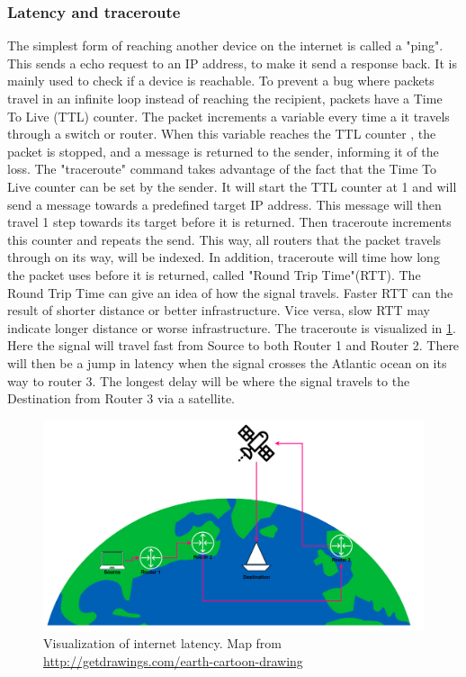 \subsubsection{Latency and traceroute} \label{sec:latency_method}
The simplest form of reaching another device on the internet is called a "ping". This sends a echo request to an IP address, to make it send a response back. It is mainly used to check if a device is reachable. To prevent a bug where packets travel in an infinite loop instead of reaching the recipient, packets have a Time To Live (TTL) counter. The packet increments a variable every time a it travels through a switch or router. When this variable reaches the TTL counter , the packet is stopped, and a message is returned to the sender, informing it of the loss.
The "traceroute" command takes advantage of the fact that the Time To Live counter can be set by the sender. It will start the TTL counter at 1 and will send a message towards a predefined target IP address. This message will then travel 1 step towards its target before it is returned. Then traceroute increments this counter and repeats the send. This way, all routers that the packet travels through on its way, will be indexed. In addition, traceroute will time how long the packet uses before it is returned, called "Round Trip Time"(RTT).
The Round Trip Time can give an idea of how the signal travels. Faster RTT can the result of shorter distance or better infrastructure. Vice versa, slow RTT may indicate longer distance or worse infrastructure.
The traceroute is visualized in \cref{fig:latency}. Here the signal will travel fast from Source to both Router 1 and Router 2. There will then be a jump in latency when the signal crosses the Atlantic ocean on its way to router 3. The longest delay will be where the signal travels to the Destination from Router 3 via a satellite.

\begin{figure} [H]
    \centering
    \includegraphics[scale=0.3]{Figurer/latency.png}
    \caption{Visualization of internet latency. Map from \href{http://getdrawings.com/earth-cartoon-drawing}{http://getdrawings.com/earth-cartoon-drawing}}
    \label{fig:latency}
\end{figure}

